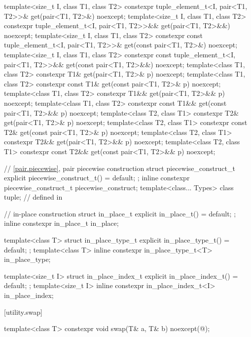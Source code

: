 \begin{codeblock}
{  template<size_t I, class T1, class T2>
    constexpr tuple_element_t<I, pair<T1, T2>>& get(pair<T1, T2>&) noexcept;
  template<size_t I, class T1, class T2>
    constexpr tuple_element_t<I, pair<T1, T2>>&& get(pair<T1, T2>&&) noexcept;
  template<size_t I, class T1, class T2>
    constexpr const tuple_element_t<I, pair<T1, T2>>& get(const pair<T1, T2>&) noexcept;
  template<size_t I, class T1, class T2>
    constexpr const tuple_element_t<I, pair<T1, T2>>&& get(const pair<T1, T2>&&) noexcept;
  template<class T1, class T2>
    constexpr T1& get(pair<T1, T2>& p) noexcept;
  template<class T1, class T2>
    constexpr const T1& get(const pair<T1, T2>& p) noexcept;
  template<class T1, class T2>
    constexpr T1&& get(pair<T1, T2>&& p) noexcept;
  template<class T1, class T2>
    constexpr const T1&& get(const pair<T1, T2>&& p) noexcept;
  template<class T2, class T1>
    constexpr T2& get(pair<T1, T2>& p) noexcept;
  template<class T2, class T1>
    constexpr const T2& get(const pair<T1, T2>& p) noexcept;
  template<class T2, class T1>
    constexpr T2&& get(pair<T1, T2>&& p) noexcept;
  template<class T2, class T1>
    constexpr const T2&& get(const pair<T1, T2>&& p) noexcept;

  // \ref{pair.piecewise}, pair piecewise construction
  struct piecewise_construct_t {
    explicit piecewise_construct_t() = default;
  };
  inline constexpr piecewise_construct_t piecewise_construct{};
  template<class... Types> class tuple;         // defined in 

  // in-place construction%
%
%
%
%
%
  struct in_place_t {
    explicit in_place_t() = default;
  };
  inline constexpr in_place_t in_place{};

  template<class T>
    struct in_place_type_t {
      explicit in_place_type_t() = default;
    };
  template<class T> inline constexpr in_place_type_t<T> in_place_type{};

  template<size_t I>
    struct in_place_index_t {
      explicit in_place_index_t() = default;
    };
  template<size_t I> inline constexpr in_place_index_t<I> in_place_index{};
}
\end{codeblock}

[utility.swap]{}

%
\begin{itemdecl}
template<class T>
  constexpr void swap(T& a, T& b) noexcept(@\seebelow@);
\end{itemdecl}

